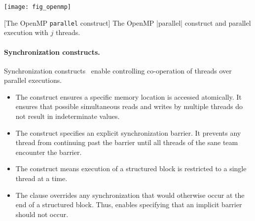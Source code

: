 \begin{center}
\captionsetup{type=lstlisting}
\begin{minipage}{.45\textwidth}
\end{minipage}\hfill%
\begin{minipage}{.5\textwidth}
\hfill\texttt{[image: fig\_openmp]}
\end{minipage}
[The OpenMP \texttt{parallel} construct]{
The OpenMP \pr|parallel| construct and parallel execution with \(j\) threads.%
}\label{lst:parallel}
\end{center}

\paragraph*{Synchronization constructs.}
Synchronization constructs~\cite[p. 473--482]{openmp_api} enable controlling co-operation of threads over parallel executions.

\begin{itemize}

\item The  construct ensures a specific memory location is accessed atomically.
It ensures that possible simultaneous reads and writes by multiple threads do not result in indeterminate values.

\item The  construct specifies an explicit synchronization barrier.
It prevents any thread from continuing past the barrier until all threads of the sane team encounter the barrier.

\item The  construct means execution of a structured block is restricted to a single thread at a time.

\item The  clause overrides any synchronization that would otherwise occur at the end of a structured block.
Thus,  enables specifying that an implicit barrier should not occur.

\end{itemize}

